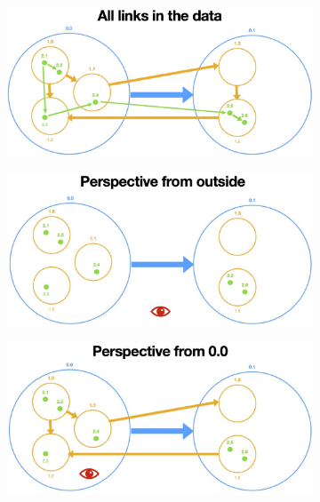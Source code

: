 \begin{figure}[h]
    \centering
    \begin{subfigure}[b]{0.6\columnwidth}
        \centering
        \includegraphics[width=\textwidth]{graphics/filterLinks/allLinks.jpg}
        \label{fig:linkFilter-all}
    \end{subfigure}
    \begin{subfigure}[b]{0.6\columnwidth}
        \centering
        \includegraphics[width=\textwidth]{graphics/filterLinks/outside.jpg}
        \label{fig:linkFilter-outside}
    \end{subfigure}
    \begin{subfigure}[b]{0.6\columnwidth}
        \centering
        \includegraphics[width=\textwidth]{graphics/filterLinks/layer0.jpg}

\end{subfigure}
\end{figure}
